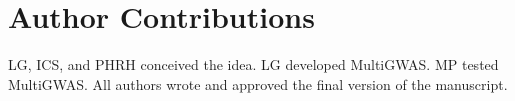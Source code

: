 \documentclass{article}
\begin{document}
\section{Author Contributions}
LG, ICS, and PHRH conceived the idea. LG developed MultiGWAS. MP tested MultiGWAS. All authors wrote and approved the final version of the manuscript.


%
%

\printbibliography
%
%
\end{document}
